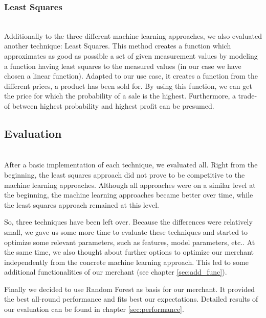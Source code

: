 \subsubsection{Least Squares}
	~\\
	Additionally to the three different machine learning approaches, we also evaluated another technique: Least Squares. This method creates a function which approximates as good as possible a set of given measurement values by modeling a function having least squares to the measured values (in our case we have chosen a linear function). Adapted to our use case, it creates a function from the different prices, a product has been sold for. By using this function, we can get the price for which the probability of a sale is the highest. Furthermore, a trade-of between highest probability and highest profit can be presumed.
\subsection{Evaluation}
\label{sec:model_eval}
	~\\
	After a basic implementation of each technique, we evaluated all. Right from the beginning, the least squares approach did not prove to be competitive to the machine learning approaches. Although all approaches were on a similar level at the beginning, the machine learning approaches became better over time, while the least squares approach remained at this level.

	So, three techniques have been left over. Because the differences were relatively small, we gave us some more time to evaluate these techniques and started to optimize some relevant parameters, such as features, model parameters, etc.. At the same time, we also thought about further options to optimize our merchant independently from the concrete machine learning approach. This led to some additional functionalities of our merchant (see chapter \ref{sec:add_func}).

    Finally we decided to use Random Forest as basis for our merchant. It provided the best all-round performance and fits best our expectations. Detailed results of our evaluation can be found in chapter \ref{sec:performance}.
